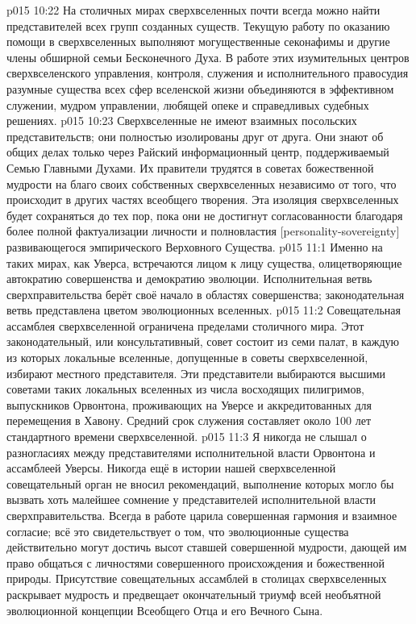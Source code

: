 \vs p015 10:22 \pc На столичных мирах сверхвселенных почти всегда можно найти представителей всех групп созданных существ. Текущую работу по оказанию помощи в сверхвселенных выполняют могущественные секонафимы и другие члены обширной семьи Бесконечного Духа. В работе этих изумительных центров сверхвселенского управления, контроля, служения и исполнительного правосудия разумные существа всех сфер вселенской жизни объединяются в эффективном служении, мудром управлении, любящей опеке и справедливых судебных решениях.
\vs p015 10:23 Сверхвселенные не имеют взаимных посольских представительств; они полностью изолированы друг от друга. Они знают об общих делах только через Райский информационный центр, поддерживаемый Семью Главными Духами. Их правители трудятся в советах божественной мудрости на благо своих собственных сверхвселенных независимо от того, что происходит в других частях всеобщего творения. Эта изоляция сверхвселенных будет сохраняться до тех пор, пока они не достигнут согласованности благодаря более полной фактуализации личности и полновластия [personality\hyp{}sovereignty] развивающегося эмпирического Верховного Существа.
\vs p015 11:1 Именно на таких мирах, как Уверса, встречаются лицом к лицу существа, олицетворяющие автократию совершенства и демократию эволюции. Исполнительная ветвь сверхправительства берёт своё начало в областях совершенства; законодательная ветвь представлена цветом эволюционных вселенных.
\vs p015 11:2 Совещательная ассамблея сверхвселенной ограничена пределами столичного мира. Этот законодательный, или консультативный, совет состоит из семи палат, в каждую из которых локальные вселенные, допущенные в советы сверхвселенной, избирают местного представителя. Эти представители выбираются высшими советами таких локальных вселенных из числа восходящих пилигримов, выпускников Орвонтона, проживающих на Уверсе и аккредитованных для перемещения в Хавону. Средний срок служения составляет около 100 лет стандартного времени сверхвселенной.
\vs p015 11:3 Я никогда не слышал о разногласиях между представителями исполнительной власти Орвонтона и ассамблеей Уверсы. Никогда ещё в истории нашей сверхвселенной совещательный орган не вносил рекомендаций, выполнение которых могло бы вызвать хоть малейшее сомнение у представителей исполнительной власти сверхправительства. Всегда в работе царила совершенная гармония и взаимное согласие; всё это свидетельствует о том, что эволюционные существа действительно могут достичь высот ставшей совершенной мудрости, дающей им право общаться с личностями совершенного происхождения и божественной природы. Присутствие совещательных ассамблей в столицах сверхвселенных раскрывает мудрость и предвещает окончательный триумф всей необъятной эволюционной концепции Всеобщего Отца и его Вечного Сына.
